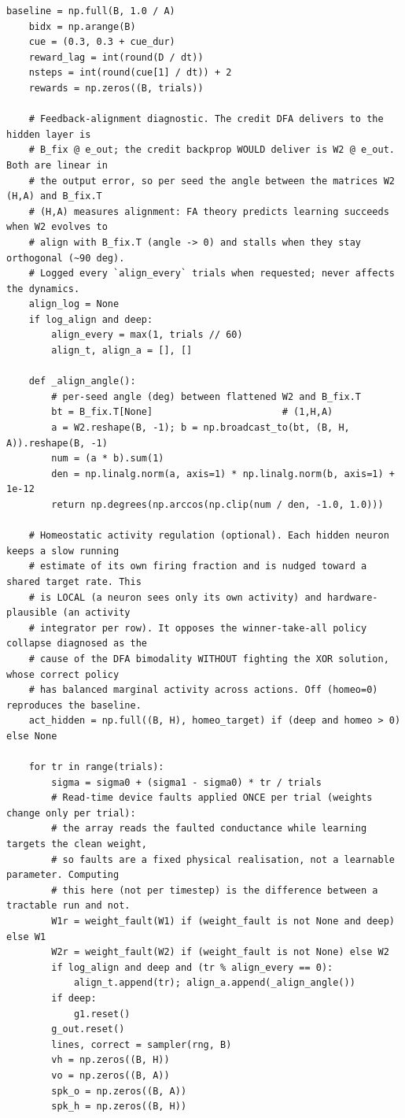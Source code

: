 \begin{lstlisting}[caption={mrl\_trace/deep.py},label={lst:siox-src-deep}]
    baseline = np.full(B, 1.0 / A)
    bidx = np.arange(B)
    cue = (0.3, 0.3 + cue_dur)
    reward_lag = int(round(D / dt))
    nsteps = int(round(cue[1] / dt)) + 2
    rewards = np.zeros((B, trials))

    # Feedback-alignment diagnostic. The credit DFA delivers to the hidden layer is
    # B_fix @ e_out; the credit backprop WOULD deliver is W2 @ e_out. Both are linear in
    # the output error, so per seed the angle between the matrices W2 (H,A) and B_fix.T
    # (H,A) measures alignment: FA theory predicts learning succeeds when W2 evolves to
    # align with B_fix.T (angle -> 0) and stalls when they stay orthogonal (~90 deg).
    # Logged every `align_every` trials when requested; never affects the dynamics.
    align_log = None
    if log_align and deep:
        align_every = max(1, trials // 60)
        align_t, align_a = [], []

    def _align_angle():
        # per-seed angle (deg) between flattened W2 and B_fix.T
        bt = B_fix.T[None]                       # (1,H,A)
        a = W2.reshape(B, -1); b = np.broadcast_to(bt, (B, H, A)).reshape(B, -1)
        num = (a * b).sum(1)
        den = np.linalg.norm(a, axis=1) * np.linalg.norm(b, axis=1) + 1e-12
        return np.degrees(np.arccos(np.clip(num / den, -1.0, 1.0)))

    # Homeostatic activity regulation (optional). Each hidden neuron keeps a slow running
    # estimate of its own firing fraction and is nudged toward a shared target rate. This
    # is LOCAL (a neuron sees only its own activity) and hardware-plausible (an activity
    # integrator per row). It opposes the winner-take-all policy collapse diagnosed as the
    # cause of the DFA bimodality WITHOUT fighting the XOR solution, whose correct policy
    # has balanced marginal activity across actions. Off (homeo=0) reproduces the baseline.
    act_hidden = np.full((B, H), homeo_target) if (deep and homeo > 0) else None

    for tr in range(trials):
        sigma = sigma0 + (sigma1 - sigma0) * tr / trials
        # Read-time device faults applied ONCE per trial (weights change only per trial):
        # the array reads the faulted conductance while learning targets the clean weight,
        # so faults are a fixed physical realisation, not a learnable parameter. Computing
        # this here (not per timestep) is the difference between a tractable run and not.
        W1r = weight_fault(W1) if (weight_fault is not None and deep) else W1
        W2r = weight_fault(W2) if (weight_fault is not None) else W2
        if log_align and deep and (tr % align_every == 0):
            align_t.append(tr); align_a.append(_align_angle())
        if deep:
            g1.reset()
        g_out.reset()
        lines, correct = sampler(rng, B)
        vh = np.zeros((B, H))
        vo = np.zeros((B, A))
        spk_o = np.zeros((B, A))
        spk_h = np.zeros((B, H))


\end{lstlisting}

